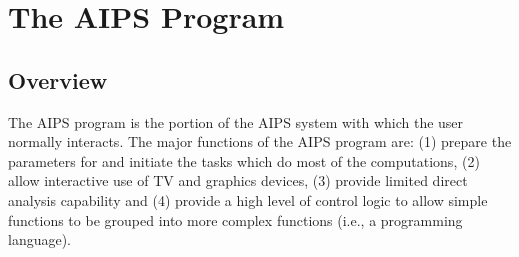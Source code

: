 \setcounter{chapter}{3} %
\chapter{The AIPS Program}
\setcounter{page}{1}

\section{Overview}
 The AIPS program is the portion of the AIPS system with which the
user normally interacts.  The major functions of the AIPS program are:
(1) prepare the parameters for and initiate the tasks which do most of
the computations, (2) allow interactive use of TV and graphics
devices, (3) provide limited direct analysis capability and (4)
provide a high level of control logic to allow simple functions to be
grouped into more complex functions (i.e., a programming language).

